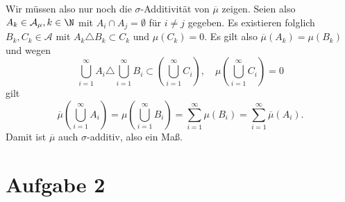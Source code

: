 \documentclass{article}
\begin{document}
    Wir müssen also nur noch die $\sigma$-Additivität von $\overline \mu$ zeigen.
    Seien also $A_k \in \mathcal{A}_\mu, k\in \N$ mit $A_i \cap A_j = \emptyset$ für $i\neq j$ gegeben. Es existieren folglich $B_k, C_k \in \mathcal{A}$ mit $A_k \triangle B_k \subset C_k$ und $\mu(C_k) = 0$. Es gilt also $\overline{\mu}(A_k) = \mu(B_k)$ und wegen 
    \[
        \bigcup_{i = 1}^\infty A_i \triangle \bigcup_{i=1}^\infty B_i \subset \left( \bigcup_{i=1}^\infty C_i\right),\quad \mu\left( \bigcup_{i=1}^\infty C_i\right) = 0
    \] gilt
    \[
        \overline \mu \left(\bigcup_{i = 1}^\infty A_i\right) = \mu \left(\bigcup_{i = 1}^\infty B_i\right) = \sum_{i = 1}^{\infty} \mu(B_i) = \sum_{i = 1}^{\infty} \overline{\mu}(A_i).
    \]
    Damit ist $\overline{\mu}$ auch $\sigma$-additiv, also ein Maß.
    \section*{Aufgabe 2}
\end{document}
